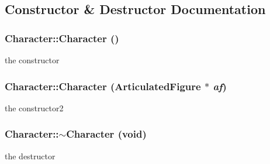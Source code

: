 \subsection{Constructor \& Destructor Documentation}
\hypertarget{classCartWheel_1_1Core_1_1Character_adc27bdd255876169bad2ed0bae0cffb5}{
\subsubsection[{Character}]{\setlength{\rightskip}{0pt plus 5cm}Character::Character ()}}
\label{classCartWheel_1_1Core_1_1Character_adc27bdd255876169bad2ed0bae0cffb5}
the constructor \hypertarget{classCartWheel_1_1Core_1_1Character_ab3561272d3c75cb62cf09635f36fe3d5}{
\subsubsection[{Character}]{\setlength{\rightskip}{0pt plus 5cm}Character::Character ({\bf ArticulatedFigure} $\ast$ {\em af})}}
\label{classCartWheel_1_1Core_1_1Character_ab3561272d3c75cb62cf09635f36fe3d5}
the constructor2 \hypertarget{classCartWheel_1_1Core_1_1Character_a377a3df3823a38d5aee3332a30285a04}{
\subsubsection[{$\sim$Character}]{\setlength{\rightskip}{0pt plus 5cm}Character::$\sim$Character (void)}}
\label{classCartWheel_1_1Core_1_1Character_a377a3df3823a38d5aee3332a30285a04}
the destructor 

